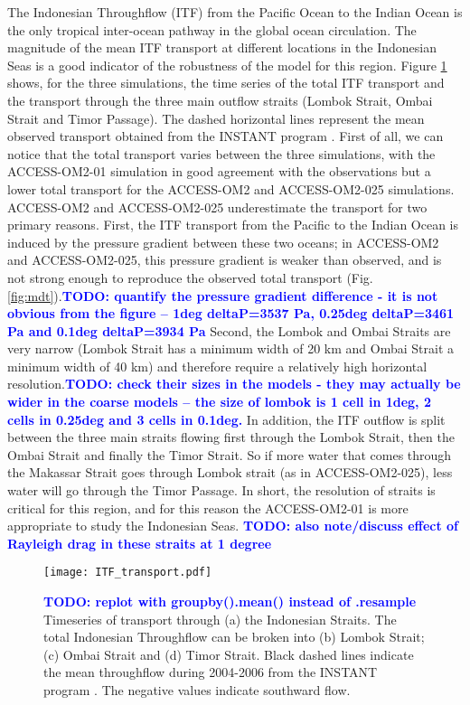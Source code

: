 \documentclass[gmd, manuscript]{copernicus}
\newcommand{\TODO}[1]{\textcolor{blue}{\textsf{\textbf{TODO: #1}}}}
\begin{document}
The Indonesian Throughflow (ITF) from the Pacific Ocean to the Indian Ocean is the only tropical inter-ocean pathway in the global ocean circulation.
The magnitude of the mean ITF transport at different locations in the Indonesian Seas is a good indicator of the robustness of the model for this region. Figure \ref{fig:ITF_transport} shows, for the three simulations, the time series of the total ITF transport and the transport through the three main outflow straits (Lombok Strait, Ombai Strait and Timor Passage).
The dashed horizontal lines represent the mean observed transport obtained from the INSTANT program \citep{Sprintall2009}. 
First of all, we can notice that the total transport varies between the three simulations, with the ACCESS-OM2-01 simulation in good agreement with the observations but a lower total transport for the ACCESS-OM2 and ACCESS-OM2-025 simulations. 
ACCESS-OM2 and ACCESS-OM2-025 underestimate the transport for two primary reasons.
First, the ITF transport from the Pacific to the Indian Ocean is induced by the pressure gradient between these two oceans; in ACCESS-OM2 and ACCESS-OM2-025, this pressure gradient is weaker than observed, and is not strong enough to reproduce the observed total transport (Fig. \ref{fig:mdt}).\TODO{quantify the pressure gradient difference - it is not obvious from the figure -- 1deg deltaP=3537 Pa, 0.25deg deltaP=3461 Pa and 0.1deg deltaP=3934 Pa} 
Second, the Lombok and Ombai Straits are very narrow (Lombok Strait has a minimum width of 20 km and Ombai Strait a minimum width of 40 km) and therefore require a relatively high horizontal resolution.\TODO{check their sizes in the models - they may actually be wider in the coarse models --  the size of lombok is 1 cell in 1deg, 2 cells in 0.25deg and 3 cells in 0.1deg.} 
In addition, the ITF outflow is split between the three main straits flowing first through the Lombok Strait, then the Ombai Strait and finally the Timor Strait.
So if more water that comes through the Makassar Strait goes through Lombok strait (as in ACCESS-OM2-025), less water will go through the Timor Passage. 
In short, the resolution of straits is critical for this region, and for this reason the ACCESS-OM2-01 is more appropriate to study the Indonesian Seas.
\TODO{also note/discuss effect of Rayleigh drag in these straits at 1 degree}

\begin{figure}[t]
\texttt{[image: ITF\_transport.pdf]}
\caption{
\TODO{replot with groupby().mean() instead of .resample} 
Timeseries of transport through (a) the Indonesian Straits. The total Indonesian Throughflow can be broken into (b) Lombok Strait; (c) Ombai Strait and (d) Timor Strait. Black dashed lines indicate the mean throughflow during 2004-2006 from the INSTANT program \citep{Sprintall2009}. The negative values indicate southward flow. \label{fig:ITF_transport}}
\end{figure}
\end{document}
